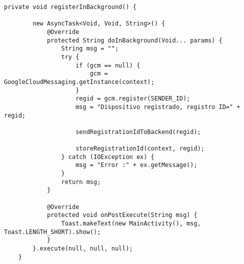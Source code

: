 \begin{lstlisting}[style=custom_JAVA]
private void registerInBackground() {

        new AsyncTask<Void, Void, String>() {
            @Override
            protected String doInBackground(Void... params) {
                String msg = "";
                try {
                    if (gcm == null) {
                        gcm = GoogleCloudMessaging.getInstance(context);
                    }
                    regid = gcm.register(SENDER_ID);
                    msg = "Dispositivo registrado, registro ID=" + regid;

                    sendRegistrationIdToBackend(regid);

                    storeRegistrationId(context, regid);
                } catch (IOException ex) {
                    msg = "Error :" + ex.getMessage();
                }
                return msg;
            }

            @Override
            protected void onPostExecute(String msg) {
                Toast.makeText(new MainActivity(), msg, Toast.LENGTH_SHORT).show();
            }
        }.execute(null, null, null);
    }
\end{lstlisting}